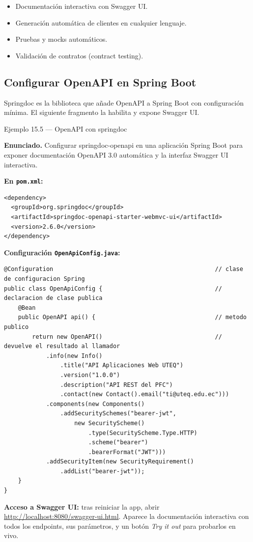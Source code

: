 \documentclass[11pt,a4paper,openany]{book}
\begin{document}
\begin{itemize}
\item Documentación interactiva con Swagger UI.
\item Generación automática de clientes en cualquier lenguaje.
\item Pruebas y mocks automáticos.
\item Validación de contratos (contract testing).
\end{itemize}

\subsection{Configurar OpenAPI en Spring Boot}

Springdoc es la biblioteca que añade OpenAPI a Spring Boot
con configuración mínima. El siguiente fragmento la habilita y
expone Swagger UI.


\begin{cajaejemplo}{Ejemplo 15.5 --- OpenAPI con springdoc}

\textbf{Enunciado.} Configurar springdoc-openapi en una aplicación Spring Boot para exponer documentación OpenAPI 3.0 automática y la interfaz Swagger UI interactiva.

\textbf{En \texttt{pom.xml}:}
\begin{lstlisting}[style=xml,numbers=none,caption={Ejemplo de XML},label=lst:15.8]
<dependency>
  <groupId>org.springdoc</groupId>
  <artifactId>springdoc-openapi-starter-webmvc-ui</artifactId>
  <version>2.6.0</version>
</dependency>
\end{lstlisting}

\textbf{Configuración \texttt{OpenApiConfig.java}:}
\begin{lstlisting}[style=java,numbers=none,caption={Ejemplo de Java},label=lst:15.9]
@Configuration                                              // clase de configuracion Spring
public class OpenApiConfig {                                // declaracion de clase publica
    @Bean
    public OpenAPI api() {                                  // metodo publico
        return new OpenAPI()                                // devuelve el resultado al llamador
            .info(new Info()
                .title("API Aplicaciones Web UTEQ")
                .version("1.0.0")
                .description("API REST del PFC")
                .contact(new Contact().email("ti@uteq.edu.ec")))
            .components(new Components()
                .addSecuritySchemes("bearer-jwt",
                    new SecurityScheme()
                        .type(SecurityScheme.Type.HTTP)
                        .scheme("bearer")
                        .bearerFormat("JWT")))
            .addSecurityItem(new SecurityRequirement()
                .addList("bearer-jwt"));
    }
}
\end{lstlisting}

\textbf{Acceso a Swagger UI:} tras reiniciar la app, abrir
\url{http://localhost:8080/swagger-ui.html}. Aparece la documentación
interactiva con todos los endpoints, sus parámetros, y un botón
\emph{Try it out} para probarlos en vivo.
\end{cajaejemplo}
\end{document}
